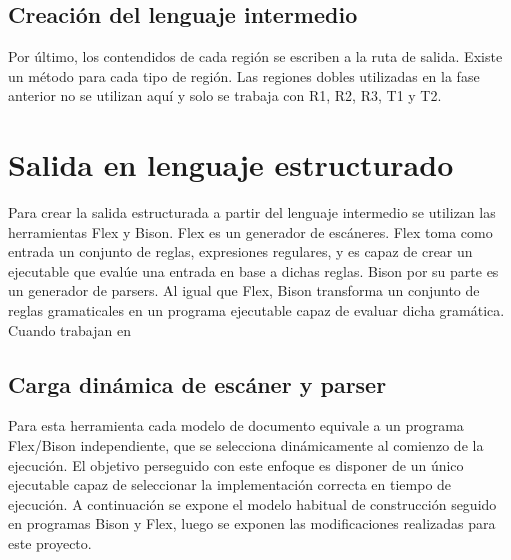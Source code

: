 



\subsection{Creación del lenguaje intermedio}

Por último, los contendidos de cada región se escriben a la ruta de salida. Existe un método para cada tipo de región. Las regiones dobles utilizadas en la fase anterior no se utilizan aquí y solo se trabaja con R1, R2, R3, T1 y T2.

\section{Salida en lenguaje estructurado}

Para crear la salida estructurada a partir del lenguaje intermedio se utilizan las herramientas Flex y Bison. Flex es un generador de escáneres. Flex toma como entrada un conjunto de reglas, expresiones regulares, y es capaz de crear un ejecutable que evalúe una entrada en base a dichas reglas. Bison por su parte es un generador de parsers. Al igual que Flex, Bison transforma un conjunto de reglas gramaticales en un programa ejecutable capaz de evaluar dicha gramática. Cuando trabajan en %

\subsection{Carga dinámica de escáner y parser}

Para esta herramienta cada modelo de documento equivale a un programa Flex/Bison independiente, que se selecciona dinámicamente al comienzo de la ejecución. El objetivo perseguido con este enfoque es disponer de un único ejecutable capaz de seleccionar la implementación correcta en tiempo de ejecución. A continuación se expone el modelo habitual de construcción seguido en programas Bison y Flex, luego se exponen las modificaciones realizadas para este proyecto.


